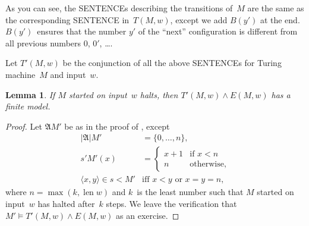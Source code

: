 \documentclass[10pt,a4paper]{article}
\makeatletter
\newcommand*{\olup}[1]{\MakeUppercase{#1}}
\theoremstyle{plain}
\newtheorem{lem}[thm]{Lemma}
\theoremstyle{definition}
\theoremstyle{remark}
\newcommand*{\ollabel}[1]{\label{#1}}
\newcommand{\olref}{\@ifnextchar[{\olref@i}{\olref@final}}
\def\olref@i[#1]{\@ifnextchar[{\olref@ii}{\olref@final}}
\def\olref@ii[#1]{\@ifnextchar[{\olref@iii}{\olref@final}}
\def\olref@iii[#1]{\olref@final}
\def\olref@final#1{\ref{#1}}
\providecommand{\lif}{\mathbin{\rightarrow}}
\providecommand{\lforall}{\mathord{\forall}}
\providecommand{\Obj}{}
\providecommand{\Struct}{\ensuremath{\mathfrak{A}}}
\providecommand{\Domain}{\ensuremath{|\mathfrak{A}|}}
\providecommand{\Assign}{\ensuremath{s}}
\providecommand{\Sat}[2]{\ensuremath{#1 \models #2}}
\providecommand{\tuple}[1]{\langle #1 \rangle}
\providecommand{\len}{\operatorname{len}}
\makeatother
\begin{document}
\begin{enumerate}
As you can see, the \olup{sentence}s describing the transitions of~$M$ 
are the same as the corresponding \olup{sentence}
in~$T(M,w)$, except we add $B(y')$ at the end. $B(y')$~ensures
that the number $y'$ of the ``next'' configuration is different from
all previous numbers $\Obj 0$, $\Obj 0'$, \dots.
\end{enumerate}
Let $T'(M, w)$ be the conjunction of all the above \olup{sentence}s for Turing
machine~$M$ and input~$w$.

\begin{lem}\ollabel{lem:halts-sat}
  If $M$ started on input~$w$ halts, then $T'(M,w) \land E(M,w)$ has
  a finite model.
\end{lem}

\begin{proof}
  Let $\Struct{M'}$ be as in the proof of
  \olref[ver]{lem:halt-if-valid}, except
  \begin{align*}
    \Domain{M'} & = \{0, \dots, n\},\\
    \Assign{\prime}{M'}(x) & = 
    \begin{cases}
      x + 1 &\text{if $x < n$}\\
      n &\text{otherwise,}
    \end{cases} \\
    \tuple{x,y} \in \Assign{<}{M'} &\text{iff $x < y$ or $x = y = n$,}
  \end{align*}
  where $n = \max(k,\len{w})$ and $k$~is the least number such that
  $M$ started on input~$w$ has halted after~$k$ steps. We leave the
  verification that $\Sat{M'}{T'(M,w) \land E(M,w)}$ as an exercise.
\end{proof}
\end{document}
